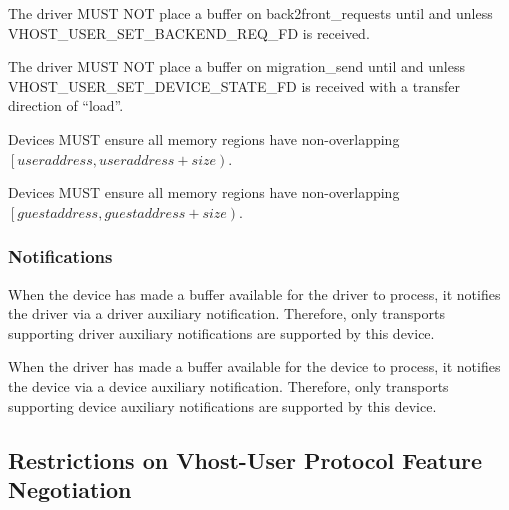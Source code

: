 
The driver MUST NOT place a buffer on back2front_requests until
and unless VHOST_USER_SET_BACKEND_REQ_FD is received.

The driver MUST NOT place a buffer on migration_send until and
unless VHOST_USER_SET_DEVICE_STATE_FD is received with a
transfer direction of ``load''.


Devices MUST ensure all memory regions have non-overlapping
$\left[user address, user address + size\right)$.

Devices MUST ensure all memory regions have non-overlapping
$\left[guest address, guest address + size\right)$.

\subsubsection{Notifications}\label{sec:Device Types / Vhost-Guest Device / Additional Resources / Notifications}

When the device has made a buffer available for the driver
to process, it notifies the driver via a driver auxiliary
notification. Therefore, only transports supporting driver
auxiliary notifications are supported by this device.

When the driver has made a buffer available for the device to
process, it notifies the device via a device auxiliary
notification. Therefore, only transports supporting device
auxiliary notifications are supported by this device.

\subsection{Restrictions on Vhost-User Protocol Feature Negotiation}\label{sec:Device Types / Vhost-Guest Device / Restrictions on Vhost-User Protocol Feature Negotiation}

